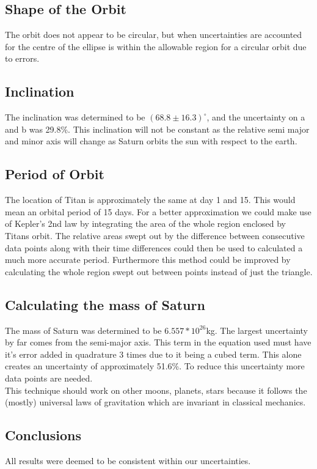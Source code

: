 \documentclass{article}
\begin{document}
\subsection{Shape of the Orbit}
The orbit does not appear to be circular, but when uncertainties are accounted for the centre of the ellipse is within the allowable region for a circular orbit due to errors.
\subsection{Inclination}
The inclination was determined to be $(68.8\pm16.3)^\circ$, and the uncertainty on a and b was 29.8\%. This inclination will not be constant as the relative semi major and minor axis will change as Saturn orbits the sun with respect to the earth.
\subsection{Period of Orbit}
The location of Titan is approximately the same at day 1 and 15. This would mean an orbital period of 15 days. For a better approximation we could make use of Kepler’s 2nd law by integrating the area of the whole region enclosed by Titans orbit. The relative areas swept out by the difference between consecutive data points along with their time differences could then be used to calculated a much more accurate period. Furthermore this method could be improved by calculating the whole region swept out between points instead of just the triangle.
\subsection{Calculating the mass of Saturn}
The mass of Saturn was determined to be $6.557*10^{26}$kg. The largest uncertainty by far comes from the semi-major axis. This term in the equation used must have it's error added in quadrature 3 times due to it being a cubed term. This alone creates an uncertainty of approximately 51.6\%. To reduce this uncertainty more data points are needed.\\

This technique should work on other moons, planets, stars because it follows the (mostly) universal laws of gravitation which are invariant in classical mechanics.

\subsection{Conclusions}
All results were deemed to be consistent within our uncertainties.\\
\end{document}

